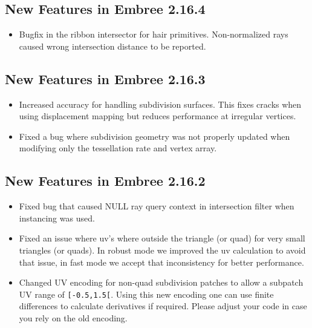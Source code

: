 \subsection{New Features in Embree
2.16.4}\label{new-features-in-embree-2.16.4}

\begin{itemize}
\tightlist
\item
  Bugfix in the ribbon intersector for hair primitives. Non-normalized
  rays caused wrong intersection distance to be reported.
\end{itemize}

\subsection{New Features in Embree
2.16.3}\label{new-features-in-embree-2.16.3}

\begin{itemize}
\tightlist
\item
  Increased accuracy for handling subdivision surfaces. This fixes
  cracks when using displacement mapping but reduces performance at
  irregular vertices.
\item
  Fixed a bug where subdivision geometry was not properly updated when
  modifying only the tessellation rate and vertex array.
\end{itemize}

\subsection{New Features in Embree
2.16.2}\label{new-features-in-embree-2.16.2}

\begin{itemize}
\tightlist
\item
  Fixed bug that caused NULL ray query context in intersection filter
  when instancing was used.
\item
  Fixed an issue where uv's where outside the triangle (or quad) for
  very small triangles (or quads). In robust mode we improved the uv
  calculation to avoid that issue, in fast mode we accept that
  inconsistency for better performance.
\item
  Changed UV encoding for non-quad subdivision patches to allow a
  subpatch UV range of \texttt{{[}-0.5,1.5{[}}. Using this new encoding
  one can use finite differences to calculate derivatives if required.
  Please adjust your code in case you rely on the old encoding.
\end{itemize}

